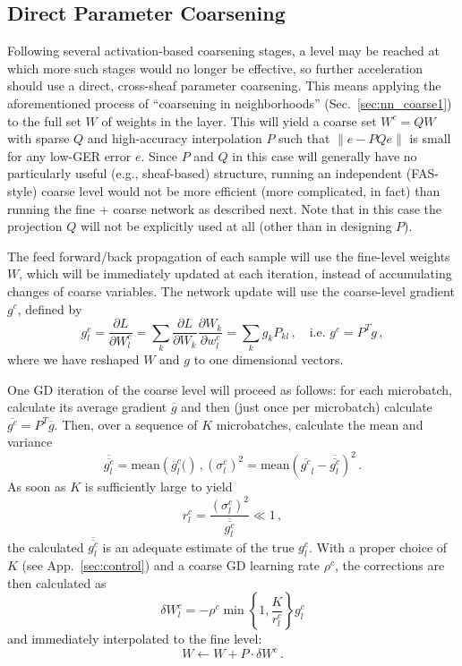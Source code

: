 \documentclass{article} %
\begin{document}
\subsection{Direct Parameter Coarsening}
\label{sec:direct_coarsening}
Following several activation-based coarsening stages, a level may be reached at which more such stages would no longer be effective, so further acceleration should use a direct, cross-sheaf parameter coarsening. This means applying the aforementioned process of ``coarsening in neighborhoods'' (Sec.~\ref{sec:nn_coarse1}) to the full set $W$ of weights in the layer. This will yield a coarse set $W^c = Q W$ with sparse $Q$ and high-accuracy interpolation $P$ such that $\|e - P Q e\|$ is small for any low-GER error $e$. Since $P$ and $Q$ in this case will generally have no particularly useful (e.g., sheaf-based) structure, running an independent (FAS-style) coarse level would not be more efficient (more complicated, in fact) than running the fine + coarse network as described next. Note that in this case the projection $Q$ will not be explicitly used at all (other than in designing $P$).

The feed forward/back propagation of each sample will use the fine-level weights $W$, which will be immediately updated at each iteration, instead of accumulating changes of coarse variables. The network update will use the coarse-level gradient $g^c$, defined by
$$
	g^c_l = \frac{\partial L}{\partial W^c_l} = 
	\sum_k \frac{\partial L}{\partial W_k} \frac{\partial W_k}{\partial w^c_l} =
	\sum_k g_k P_{kl}\,, \quad {\mbox{i.e. }} g^c = P^T g\,,
$$
where we have reshaped $W$ and $g$ to one dimensional vectors.

One GD iteration of the coarse level will proceed as follows: for each microbatch, calculate its average gradient $\overline{g}$ and then (just once per microbatch) calculate $\overline{g^c} = P^T \overline{g}$. Then, over a sequence of $K$ microbatches, calculate the mean and variance
$$
 \overline{\overline{g^c_l}} = {\mbox{mean}}\left( \overline{g}^c_l(\right)\,,
 (\sigma^c_l)^2 = {\mbox{mean}}\left( \overline{g^c}_l - \overline{\overline{g^c_l}} \right)^2\,.
 $$
As soon as $K$ is sufficiently large to yield
$$ r^c_l = \frac{(\sigma^c_l)^2}{\overline{\overline{g^c_l}}} \ll 1\,,$$
 the calculated $\overline{\overline{g^c_l}}$ is an adequate estimate of the true $g^c_l$. With a proper choice of $K$ (see App.~\ref{sec:control}) and a coarse GD learning rate $\rho^c$, the corrections are then calculated as
$$
	\delta W^c_l = - \rho^c \min\left\{ 1, \frac{K}{r^c_l} \right\} g^c_l
$$
and immediately interpolated to the fine level:
$$ W \longleftarrow W + P \cdot \delta W^c\,.$$
\end{document}
